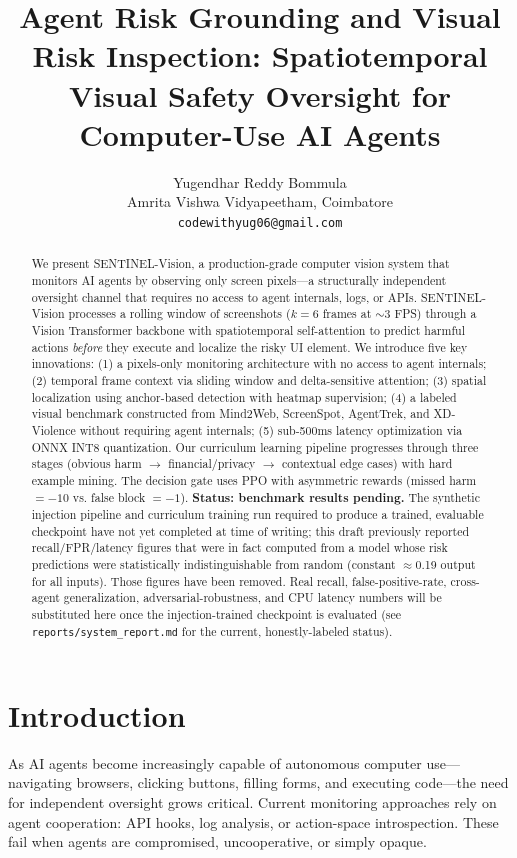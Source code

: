 \documentclass[11pt,a4paper]{article}
\title{Agent Risk Grounding and Visual Risk Inspection: Spatiotemporal Visual Safety Oversight for Computer-Use AI Agents}
\author{
    Yugendhar Reddy Bommula\\
    \small Amrita Vishwa Vidyapeetham, Coimbatore\\
    \small\texttt{codewithyug06@gmail.com}
}
\date{}
\begin{document}
\maketitle

\begin{abstract}
We present SENTINEL-Vision, a production-grade computer vision system that monitors AI agents by observing only screen pixels---a structurally independent oversight channel that requires no access to agent internals, logs, or APIs. SENTINEL-Vision processes a rolling window of screenshots ($k=6$ frames at $\sim$3 FPS) through a Vision Transformer backbone with spatiotemporal self-attention to predict harmful actions \emph{before} they execute and localize the risky UI element. We introduce five key innovations: (1) a pixels-only monitoring architecture with no access to agent internals; (2) temporal frame context via sliding window and delta-sensitive attention; (3) spatial localization using anchor-based detection with heatmap supervision; (4) a labeled visual benchmark constructed from Mind2Web, ScreenSpot, AgentTrek, and XD-Violence without requiring agent internals; (5) sub-500ms latency optimization via ONNX INT8 quantization. Our curriculum learning pipeline progresses through three stages (obvious harm $\to$ financial/privacy $\to$ contextual edge cases) with hard example mining. The decision gate uses PPO with asymmetric rewards (missed harm $=-10$ vs. false block $=-1$). \textbf{Status: benchmark results pending.} The synthetic injection pipeline and curriculum training run required to produce a trained, evaluable checkpoint have not yet completed at time of writing; this draft previously reported recall/FPR/latency figures that were in fact computed from a model whose risk predictions were statistically indistinguishable from random (constant $\approx$0.19 output for all inputs). Those figures have been removed. Real recall, false-positive-rate, cross-agent generalization, adversarial-robustness, and CPU latency numbers will be substituted here once the injection-trained checkpoint is evaluated (see \texttt{reports/system\_report.md} for the current, honestly-labeled status).
\end{abstract}

\section{Introduction}

As AI agents become increasingly capable of autonomous computer use---navigating browsers, clicking buttons, filling forms, and executing code---the need for independent oversight grows critical. Current monitoring approaches rely on agent cooperation: API hooks, log analysis, or action-space introspection. These fail when agents are compromised, uncooperative, or simply opaque.
\end{document}
